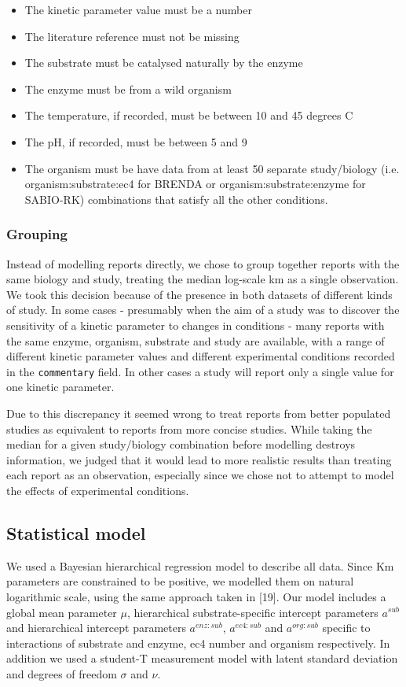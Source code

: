 \documentclass[11pt]{article}
\makeatletter
\newcommand{\citeprocitem}[2]{\hyper@linkstart{cite}{citeproc_bib_item_#1}#2\hyper@linkend}
\makeatother
\begin{document}
\begin{itemize}
\item The kinetic parameter value must be a number
\item The literature reference must not be missing
\item The substrate must be catalysed naturally by the enzyme
\item The enzyme must be from a wild organism
\item The temperature, if recorded, must be between 10 and 45 degrees C
\item The pH, if recorded, must be between 5 and 9
\item The organism must be have data from at least 50 separate study/biology
(i.e. organism:substrate:ec4 for BRENDA or organism:substrate:enzyme for
SABIO-RK) combinations that satisfy all the other conditions.
\end{itemize}

\subsubsection{Grouping}
\label{sec:org3d149b3}
Instead of modelling reports directly, we chose to group together reports with
the same biology and study, treating the median log-scale km as a single
observation. We took this decision because of the presence in both datasets of
different kinds of study. In some cases - presumably when the aim of a study was
to discover the sensitivity of a kinetic parameter to changes in conditions -
many reports with the same enzyme, organism, substrate and study are available,
with a range of different kinetic parameter values and different experimental
conditions recorded in the \texttt{commentary} field. In other cases a study will
report only a single value for one kinetic parameter.

Due to this discrepancy it seemed wrong to treat reports from better populated
studies as equivalent to reports from more concise studies. While taking the
median for a given study/biology combination before modelling destroys
information, we judged that it would lead to more realistic results than
treating each report as an observation, especially since we chose not to
attempt to model the effects of experimental conditions.

\subsection{Statistical model}
\label{sec:org3ef838a}
We used a Bayesian hierarchical regression model to describe all data. Since Km
parameters are constrained to be positive, we modelled them on natural
logarithmic scale, using the same approach taken in
\citeprocitem{19}{[19]}. Our model includes a global mean
parameter \(\mu\), hierarchical substrate-specific intercept parameters \(a^{sub}\)
and hierarchical intercept parameters \(a^{enz:sub}\), \(a^{ec4:sub}\) and
\(a^{org:sub}\) specific to interactions of substrate and enzyme, ec4 number and
organism respectively. In addition we used a student-T measurement model with
latent standard deviation and degrees of freedom \(\sigma\) and \(\nu\).
\end{document}
